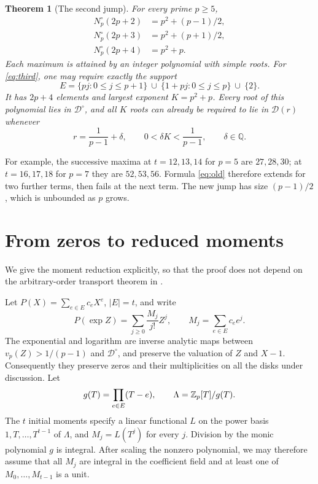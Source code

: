 \documentclass[11pt]{article}
\newtheorem{theorem}{Theorem}[section]
\theoremstyle{remark}\newtheorem{remark}[theorem]{Remark}
\begin{document}
\begin{theorem}[The second jump]\label{thm:main}
For every prime $p\ge5$,
\begin{align}
 N_p^\circ(2p+2)&=p^2+(p-1)/2,\label{eq:first}\\
 N_p^\circ(2p+3)&=p^2+(p+1)/2,\label{eq:second}\\
 N_p^\circ(2p+4)&=p^2+p.\label{eq:third}
\end{align}
Each maximum is attained by an integer polynomial with simple roots. For \eqref{eq:third}, one may require exactly the support
\begin{equation}\label{eq:support}
 E=\{pj:0\le j\le p+1\}\ \cup\ \{1+pj:0\le j\le p\}\ \cup\ \{2\}.
\end{equation}
It has $2p+4$ elements and largest exponent $K=p^2+p$. Every root of this polynomial lies in $\mathcal D^\circ$, and all $K$ roots can already be required to lie in $\mathcal D(r)$ whenever
\begin{equation}\label{eq:depth}
 r=\frac1{p-1}+\delta,\qquad 0<\delta K<\frac1{p-1},\qquad \delta\in\mathbb Q.
\end{equation}
\end{theorem}

For example, the successive maxima at $t=12,13,14$ for $p=5$ are $27,28,30$; at $t=16,17,18$ for $p=7$ they are $52,53,56$. Formula \eqref{eq:old} therefore extends for two further terms, then fails at the next term. The new jump has size $(p-1)/2$, which is unbounded as $p$ grows.

\section{From zeros to reduced moments}
We give the moment reduction explicitly, so that the proof does not depend on the arbitrary-order transport theorem in \cite{transport}.

Let $P(X)=\sum_{e\in E}c_eX^e$, $|E|=t$, and write
\[
 P(\exp Z)=\sum_{j\ge0}\frac{M_j}{j!}Z^j,
 \qquad M_j=\sum_{e\in E}c_e e^j.
\]
The exponential and logarithm are inverse analytic maps between $v_p(Z)>1/(p-1)$ and $\mathcal D^\circ$, and preserve the valuation of $Z$ and $X-1$. Consequently they preserve zeros and their multiplicities on all the disks under discussion. Let
\[
 g(T)=\prod_{e\in E}(T-e),\qquad \Lambda=\mathbb Z_p[T]/g(T).
\]
The $t$ initial moments specify a linear functional $L$ on the power basis $1,T,\ldots,T^{t-1}$ of $\Lambda$, and $M_j=L(T^j)$ for every $j$. Division by the monic polynomial $g$ is integral. After scaling the nonzero polynomial, we may therefore assume that all $M_j$ are integral in the coefficient field and at least one of $M_0,\ldots,M_{t-1}$ is a unit.
\end{document}
